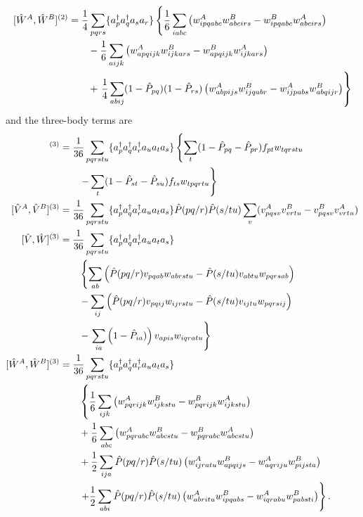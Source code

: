 \begin{align}
[\hat{W}^A, \hat{W}^B ]^{(2)} &= \frac{1}{4}\sum_{pqrs}\lbrace a^{\dagger}_pa^{\dagger}_q a_s a_r \rbrace \left\lbrace\frac{1}{6} \sum_{iabc}\left( w^A_{ipqabc} w^B_{abcirs} -  w^B_{ipqabc} w^A_{abcirs}\right) \right.\notag \\
& \qquad - \frac{1}{6} \sum_{aijk}\left( w^A_{apqijk} w^B_{ijkars} -  w^B_{apqijk} w^A_{ijkars}\right) \notag \\
&\qquad + \left.\frac{1}{4} \sum_{abij} (1-\hat{P}_{pq})(1-\hat{P}_{rs}) \left( w^A_{abpijs} w^B_{ijqabr} - w^A_{ijpabs} w^B_{abqijr} \right) \right\rbrace
\end{align}
and the three-body terms are
\begin{align}
[\hat{F},\hat{W}]^{(3)} &= \frac{1}{36} \sum_{pqrstu} \lbrace \ad_p\ad_q\ad_r a_u a_t a_s \rbrace\left\lbrace \sum_t (1-\hat{P}_{pq}-\hat{P}_{pr}) f_{pt} w_{tqrstu} \right.\notag \\
&\left.\qquad - \sum_t (1-\hat{P}_{st}-\hat{P}_{su}) f_{ts} w_{tpqrtu} \right\rbrace \\
[\hat{V}^A,\hat{V}^B]^{(3)} &= \frac{1}{36} \sum_{pqrstu} \lbrace \ad_p\ad_q\ad_r a_u a_t a_s \rbrace 
 \hat{P}(pq/r) \hat{P}(s/tu) \sum_v (v^A_{pqsv}v^B_{vrtu} - v^B_{pqsv}v^A_{vrtu} )\\
[\hat{V},\hat{W}]^{(3)} &= \frac{1}{36} \sum_{pqrstu} \lbrace \ad_p\ad_q\ad_r a_u a_t a_s \rbrace \\
&\qquad\left\lbrace \sum_{ab} \lb \hat{P}(pq/r)v_{pqab}w_{abrstu} - \hat{P}(s/tu) v_{abtu}w_{pqrsab} \rb \right.\notag \\
& \qquad -\sum_{ij} \lb \hat{P}(pq/r)v_{pqij}w_{ijrstu} - \hat{P}(s/tu) v_{ijtu}w_{pqrsij} \rb\\
&\qquad - \left. \sum_{ia}\lb 1-\hat{P}_{ia})\rb v_{apis}w_{iqratu}
\right\rbrace\\
[\hat{W}^A,\hat{W}^B]^{(3)} &=  \frac{1}{36} \sum_{pqrstu} \lbrace \ad_p\ad_q\ad_r a_u a_t a_s \rbrace \notag \\
&\qquad  \left\lbrace \frac{1}{6} \sum_{ijk}\lb w^A_{pqrijk} w^B_{ijkstu}- w^B_{pqrijk} w^A_{ijkstu} \rb \right.\notag \\
&\qquad + \frac{1}{6} \sum_{abc}\lb w^A_{pqrabc} w^B_{abcstu}- w^B_{pqrabc} w^A_{abcstu} \rb\notag\\
&\qquad+ \frac{1}{2} \sum_{ija} \hat{P}(pq/r)\hat{P}(s/tu)\lb w^A_{ijratu} w^B_{apqijs} - w^A_{aqriju}w^B_{pijsta}\rb\notag\\
&\qquad  \left.+ \frac{1}{2} \sum_{abi} \hat{P}(pq/r)\hat{P}(s/tu)\lb w^A_{abritu} w^B_{ipqabs} - w^A_{iqrabu}w^B_{pabsti}\rb \right\rbrace.
\end{align}


